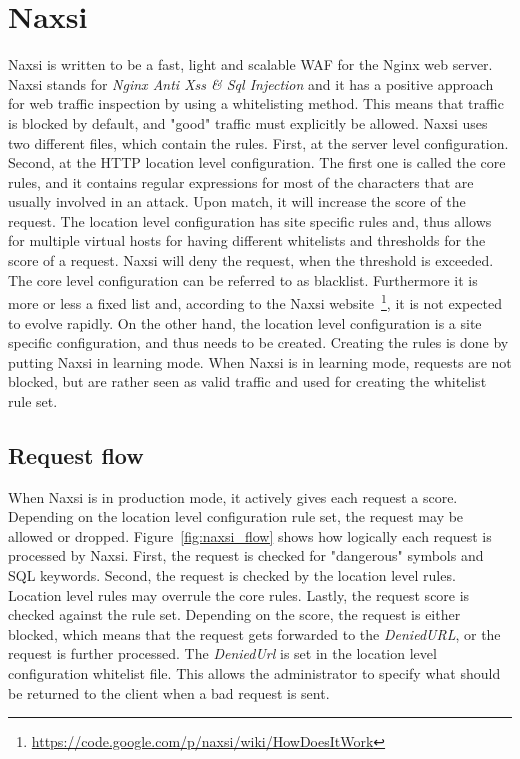 \documentclass[Naxsi]{subfiles}
\begin{document}
\section{Naxsi}
\label{sec:Naxsi}
Naxsi is written to be a fast, light and scalable \ac{WAF} for the Nginx web server. Naxsi stands for \textit{Nginx Anti Xss \& Sql Injection} and it has a positive approach for web traffic inspection by using a whitelisting method. This means that traffic is blocked by default, and "good" traffic must explicitly be allowed. Naxsi uses two different files, which contain the rules. First, at the server level configuration. Second, at the HTTP location level configuration. The first one is called the core rules, and it contains regular expressions for most of the characters that are usually involved in an attack. Upon match, it will increase the score of the request. The location level configuration has site specific rules and, thus allows for multiple virtual hosts for having different whitelists and thresholds for the score of a request. Naxsi will deny the request, when the threshold is exceeded. The core level configuration can be referred to as blacklist. Furthermore it is more or less a fixed list and, according to the Naxsi website~\footnote{\url{https://code.google.com/p/naxsi/wiki/HowDoesItWork}}, it is not expected to evolve rapidly. On the other hand, the location level configuration is a site specific configuration, and thus needs to be created. Creating the rules is done by putting Naxsi in learning mode. When Naxsi is in learning mode, requests are not blocked, but are rather seen as valid traffic and used for creating the whitelist rule set.

\subsection{Request flow}
When Naxsi is in production mode, it actively gives each request a score. Depending on the location level configuration rule set, the request may be allowed or dropped. Figure~\ref{fig:naxsi_flow} shows how logically each request is processed by Naxsi. First, the request is checked for "dangerous" symbols and SQL keywords. Second, the request is checked by the location level rules. Location level rules may overrule the core rules. Lastly, the request score is checked against the rule set. Depending on the score, the request is either blocked, which means that the request gets forwarded to the \textit{DeniedURL}, or the request is further processed. The \textit{DeniedUrl} is set in the location level configuration whitelist file. This allows the administrator to specify what should be returned to the client when a bad request is sent.
\end{document}
